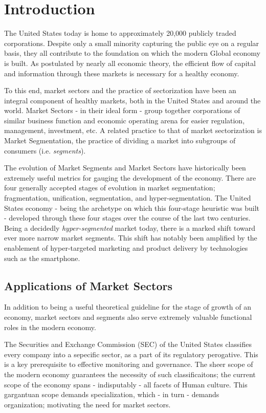 \documentclass[../main.tex]{subfiles}
\begin{document}
    
\chapter{Introduction}

The United States today is home to approximately 20,000 publicly traded corporations. Despite only a small minority capturing the public eye on a regular basis, they all contribute to the foundation on which the modern Global economy is built. As postulated by nearly all economic theory, the efficient flow of capital and information through these markets is necessary for a healthy economy.

To this end, market sectors and the practice of sectorization have been an integral component of healthy markets, both in the United States and around the world. Market Sectors - in their ideal form - group together corporations of similar business function and economic operating arena for easier regulation, management, investment, etc. A related practice to that of market sectorization is Market Segmentation, the practice of dividing a market into subgroups of consumers (i.e. \textit{segments}).

The evolution of Market Segments and Market Sectors have historically been extremely useful metrics for gauging the development of the economy. There are four generally accepted stages of evolution in market segmentation; fragmentation, unification, segmentation, and hyper-segmentation. The United States economy - being the archetype on which this four-stage heuristic was built - developed through these four stages over the course of the last two centuries. Being a decidedly \textit{hyper-segmented} market today, there is a marked shift toward ever more narrow market segments. This shift has notably been amplified by the enablement of hyper-targeted marketing and product delivery by technologies such as the smartphone.

\section{Applications of Market Sectors}

In addition to being a useful theoretical guideline for the stage of growth of an economy, market sectors and segments also serve extremely valuable functional roles in the modern economy.

The Securities and Exchange Commission (SEC) of the United States classifies every company into a sepecific sector, as a part of its regulatory perogative. This is a key prerequisite to effective monitoring and governance. The sheer scope of the modern economy guarantees the necessity of such classificaitons; the current scope of the economy spans - indisputably - all facets of Human culture. This gargantuan scope demands specialization, which - in turn - demands organization; motivating the need for market sectors.
\end{document}
